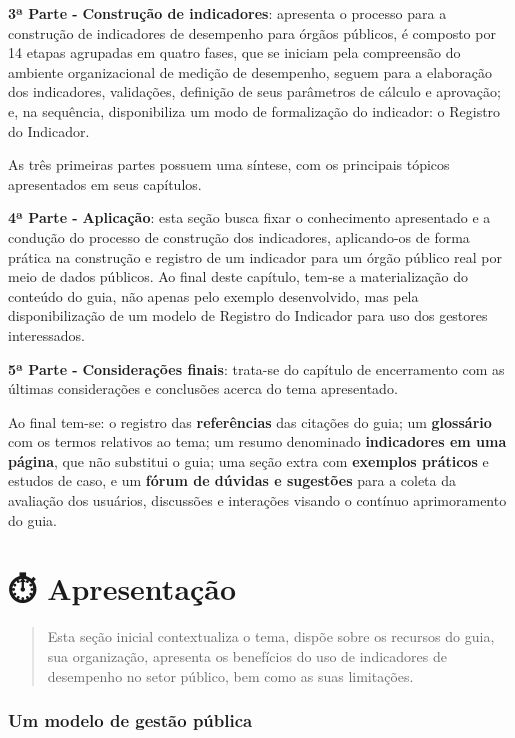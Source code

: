 \documentclass[
  letterpaper,
  DIV=11,
  numbers=noendperiod]{scrreprt}
\begin{document}
\textbf{3ª Parte -} \textbf{Construção de indicadores}: apresenta o
processo para a construção de indicadores de desempenho para órgãos
públicos, é composto por 14 etapas agrupadas em quatro fases, que se
iniciam pela compreensão do ambiente organizacional de medição de
desempenho, seguem para a elaboração dos indicadores, validações,
definição de seus parâmetros de cálculo e aprovação; e, na sequência,
disponibiliza um modo de formalização do indicador: o Registro do
Indicador.

As três primeiras partes possuem uma síntese, com os principais tópicos
apresentados em seus capítulos.

\textbf{4ª Parte -} \textbf{Aplicação}: esta seção busca fixar o
conhecimento apresentado e a condução do processo de construção dos
indicadores, aplicando-os de forma prática na construção e registro de
um indicador para um órgão público real por meio de dados públicos. Ao
final deste capítulo, tem-se a materialização do conteúdo do guia, não
apenas pelo exemplo desenvolvido, mas pela disponibilização de um modelo
de Registro do Indicador para uso dos gestores interessados.

\textbf{5ª Parte -} \textbf{Considerações finais}: trata-se do capítulo
de encerramento com as últimas considerações e conclusões acerca do tema
apresentado.

Ao final tem-se: o registro das \textbf{referências} das citações do
guia; um \textbf{glossário} com os termos relativos ao tema; um resumo
denominado \textbf{indicadores em uma página}, que não substitui o guia;
uma seção extra com \textbf{exemplos práticos} e estudos de caso, e um
\textbf{fórum de dúvidas e sugestões} para a coleta da avaliação dos
usuários, discussões e interações visando o contínuo aprimoramento do
guia.

\part{⏱️ Apresentação}

\begin{quote}
Esta seção inicial contextualiza o tema, dispõe sobre os recursos do
guia, sua organização, apresenta os benefícios do uso de indicadores de
desempenho no setor público, bem como as suas limitações.
\end{quote}

\hypertarget{um-modelo-de-gestuxe3o-puxfablica}{%
\section*{Um modelo de gestão
pública}\label{um-modelo-de-gestuxe3o-puxfablica}}
\end{document}
